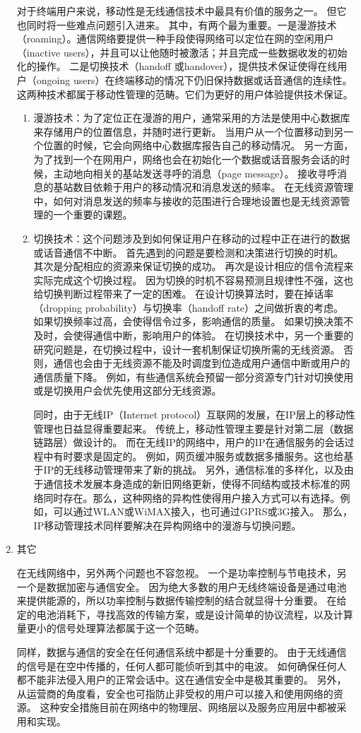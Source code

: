 \begin{enumerate}[1)]
对于终端用户来说，移动性是无线通信技术中最具有价值的服务之一。
但它也同时将一些难点问题引入进来。
其中，有两个最为重要。一是漫游技术（roaming）。通信网络要提供一种手段使得网络可以定位在网的空闲用户（inactive users），并且可以让他随时被激活；并且完成一些数据收发的初始化的操作。
二是切换技术（handoff 或handover），提供技术保证使得在线用户（ongoing users）在终端移动的情况下仍旧保持数据或话音通信的连续性。
这两种技术都属于移动性管理的范畴。它们为更好的用户体验提供技术保证。
\begin{enumerate}[(1)]
\item 漫游技术：为了定位正在漫游的用户，通常采用的方法是使用中心数据库来存储用户的位置信息，并随时进行更新。
当用户从一个位置移动到另一个位置的时候，它会向网络中心数据库报告自己的移动情况。
另一方面，为了找到一个在网用户，网络也会在初始化一个数据或话音服务会话的时候，主动地向相关的基站发送寻呼的消息（page message）。
接收寻呼消息的基站数目依赖于用户的移动情况和消息发送的频率。
在无线资源管理中，如何对消息发送的频率与接收的范围进行合理地设置也是无线资源管理的一个重要的课题。
\item 切换技术：这个问题涉及到如何保证用户在移动的过程中正在进行的数据或话音通信不中断。
首先遇到的问题是要检测和决策进行切换的时机。
其次是分配相应的资源来保证切换的成功。
再次是设计相应的信令流程来实际完成这个切换过程。
因为切换的时机不容易预测且规律性不强，这也给切换判断过程带来了一定的困难。
在设计切换算法时，要在掉话率（dropping probability）与切换率（handoff rate）之间做折衷的考虑。
如果切换频率过高，会使得信令过多，影响通信的质量。
如果切换决策不及时，会使得通信中断，影响用户的体验。
在切换技术中，另一个重要的研究问题是，在切换过程中，设计一套机制保证切换所需的无线资源。
否则，通信也会由于无线资源不能及时调度到位造成用户通信中断或用户的通信质量下降。
例如，有些通信系统会预留一部分资源专门针对切换使用或是切换用户会优先使用这部分无线资源。

同时，由于无线IP（Internet protocol）互联网的发展，在IP层上的移动性管理也日益显得重要起来。
传统上，移动性管理主要是针对第二层（数据链路层）做设计的。
而在无线IP的网络中，用户的IP在通信服务的会话过程中有时要求是固定的。
例如，网页缓冲服务或数据多播服务。这也给基于IP的无线移动管理带来了新的挑战。
另外，通信标准的多样化，以及由于通信技术发展本身造成的新旧网络更新，使得不同结构或技术标准的网络同时存在。那么，这种网络的异构性使得用户接入方式可以有选择。例如，可以通过WLAN或WiMAX接入，也可通过GPRS或3G接入。
那么，IP移动管理技术同样要解决在异构网络中的漫游与切换问题。
\end{enumerate}
%
\item 其它
\par 在无线网络中，另外两个问题也不容忽视。
一个是功率控制与节电技术，另一个是数据加密与通信安全。
因为绝大多数的用户无线终端设备是通过电池来提供能源的，所以功率控制与数据传输控制的结合就显得十分重要。
在给定的电池消耗下，寻找高效的传输方案，或是设计简单的协议流程，以及计算量更小的信号处理算法都属于这一个范畴。

同样，数据与通信的安全在任何通信系统中都是十分重要的。
由于无线通信的信号是在空中传播的，任何人都可能侦听到其中的电波。
如何确保任何人都不能非法侵入用户的正常会话中。这在通信安全中是极其重要的。
另外，从运营商的角度看，安全也可指防止非受权的用户可以接入和使用网络的资源。
这种安全措施目前在网络中的物理层、网络层以及服务应用层中都被采用和实现。
\end{enumerate}
